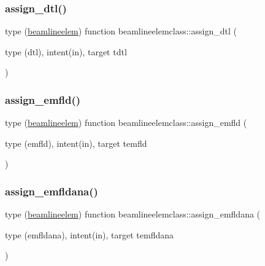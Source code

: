 \mbox{\label{namespacebeamlineelemclass_a56b55ab902212809615ff965f7e6591d}} 
\subsubsection{\texorpdfstring{assign\_dtl()}{assign\_dtl()}}
{\footnotesize\ttfamily type (\mbox{\hyperlink{namespacebeamlineelemclass_structbeamlineelemclass_1_1beamlineelem}{beamlineelem}}) function beamlineelemclass\+::assign\+\_\+dtl (\begin{DoxyParamCaption}\item[{type (dtl), intent(in), target}]{tdtl }\end{DoxyParamCaption})}

\mbox{\label{namespacebeamlineelemclass_ac9cc1a9326b192530803d06d2e8b088b}} 
\subsubsection{\texorpdfstring{assign\_emfld()}{assign\_emfld()}}
{\footnotesize\ttfamily type (\mbox{\hyperlink{namespacebeamlineelemclass_structbeamlineelemclass_1_1beamlineelem}{beamlineelem}}) function beamlineelemclass\+::assign\+\_\+emfld (\begin{DoxyParamCaption}\item[{type (emfld), intent(in), target}]{temfld }\end{DoxyParamCaption})}

\mbox{\label{namespacebeamlineelemclass_a2cd5ca28bafb3c67cde6af5b0677473f}} 
\subsubsection{\texorpdfstring{assign\_emfldana()}{assign\_emfldana()}}
{\footnotesize\ttfamily type (\mbox{\hyperlink{namespacebeamlineelemclass_structbeamlineelemclass_1_1beamlineelem}{beamlineelem}}) function beamlineelemclass\+::assign\+\_\+emfldana (\begin{DoxyParamCaption}\item[{type (emfldana), intent(in), target}]{temfldana }\end{DoxyParamCaption})}

